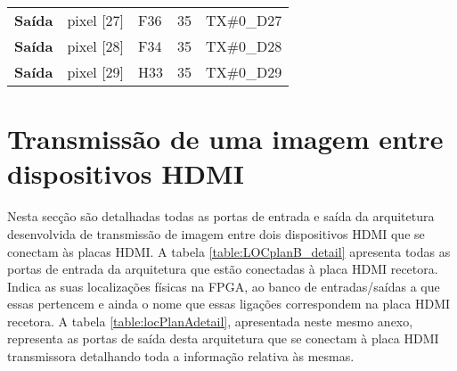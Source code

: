 \begin{longtable}{@{}rllll@{}}
			\multicolumn{1}{r|}{\textbf{Saída}} & pixel {[}27{]}                     & F36                                      & 35                                         & TX\#0\_D27                                      \\
			\multicolumn{1}{r|}{\textbf{Saída}} & pixel {[}28{]}                     & F34                                      & 35                                         & TX\#0\_D28                                      \\
			\multicolumn{1}{r|}{\textbf{Saída}} & pixel {[}29{]}                     & H33                                      & 35                                         & TX\#0\_D29                                      \\  
			\hline 

\end{longtable}

\section{Transmissão de uma imagem entre dispositivos HDMI} \label{ap3:imagem_RX_TX}
%
Nesta secção são detalhadas todas as portas de entrada e saída da arquitetura desenvolvida de transmissão de imagem entre dois dispositivos HDMI que se conectam às placas HDMI. 
%
A tabela \ref{table:LOCplanB_detail} apresenta todas as portas de entrada da arquitetura que estão conectadas à placa HDMI recetora. Indica as suas localizações físicas na FPGA, ao banco de entradas/saídas a que essas pertencem e ainda o nome que essas ligações correspondem na placa HDMI recetora. A tabela \ref{table:locPlanAdetail}, apresentada neste mesmo anexo, representa as portas de saída desta arquitetura que se conectam à placa HDMI transmissora detalhando toda a informação relativa às mesmas.

